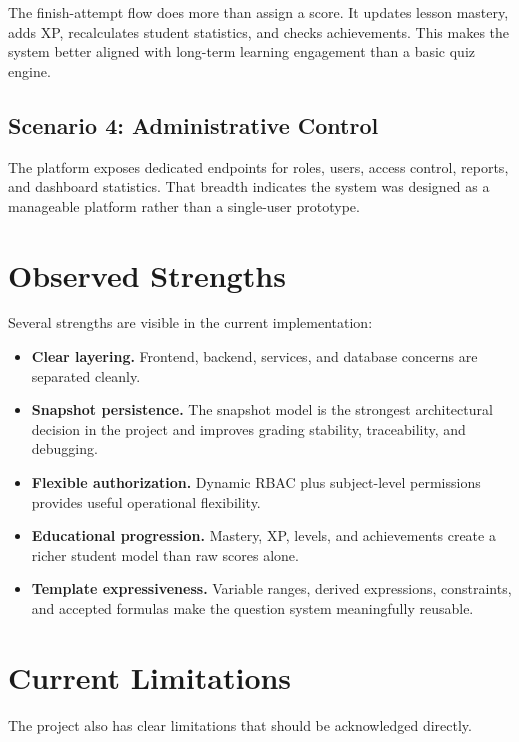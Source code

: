 The finish-attempt flow does more than assign a score. It updates lesson mastery, adds XP, recalculates student statistics, and checks achievements. This makes the system better aligned with long-term learning engagement than a basic quiz engine.

\subsection*{Scenario 4: Administrative Control}

The platform exposes dedicated endpoints for roles, users, access control, reports, and dashboard statistics. That breadth indicates the system was designed as a manageable platform rather than a single-user prototype.

\section{Observed Strengths}

Several strengths are visible in the current implementation:
\begin{itemize}
  \item \textbf{Clear layering.} Frontend, backend, services, and database concerns are separated cleanly.
  \item \textbf{Snapshot persistence.} The snapshot model is the strongest architectural decision in the project and improves grading stability, traceability, and debugging.
  \item \textbf{Flexible authorization.} Dynamic RBAC plus subject-level permissions provides useful operational flexibility.
  \item \textbf{Educational progression.} Mastery, XP, levels, and achievements create a richer student model than raw scores alone.
  \item \textbf{Template expressiveness.} Variable ranges, derived expressions, constraints, and accepted formulas make the question system meaningfully reusable.
\end{itemize}

\section{Current Limitations}

The project also has clear limitations that should be acknowledged directly.

